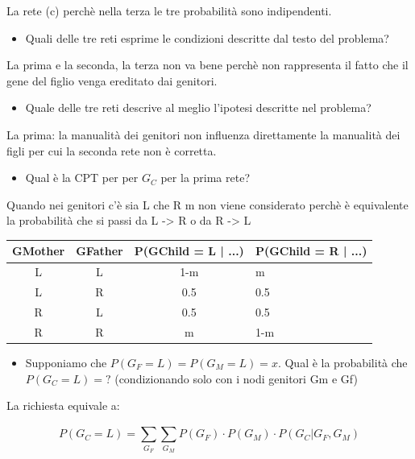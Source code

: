 \documentclass{article}
\begin{document}
La rete (c) perchè nella terza le tre probabilità sono indipendenti.

\begin{itemize}
	\item Quali delle tre reti esprime le condizioni descritte dal testo del problema?
\end{itemize}

La prima e la seconda, la terza non va bene perchè non rappresenta il fatto che il gene del figlio venga ereditato dai genitori.

\begin{itemize}
	\item Quale delle tre reti descrive al meglio l'ipotesi descritte nel problema?
\end{itemize}

	La prima: la manualità dei genitori non influenza direttamente la manualità dei figli per cui la seconda rete non è corretta.

\begin{itemize}
	\item Qual è la CPT per per \(G_C\) per la prima rete?
\end{itemize}
Quando nei genitori c'è sia L che R m non viene considerato perchè è equivalente la probabilità che si passi da L -> R o da R -> L \\

\begin{tabular}{|c|c|c|l|}
	\hline
	GMother & GFather & P(GChild = L | ...) & P(GChild  = R | ...) \\ \hline
	L       & L       & 1-m                 & m                    \\ \hline
	L       & R       & 0.5                 & 0.5                  \\ \hline
	R       & L       & 0.5                 & 0.5                  \\ \hline
	R       & R       & m                   & 1-m                  \\ \hline
\end{tabular}

\pagebreak

\begin{itemize}
	\item Supponiamo che \( P(G_F = L)  =  P(G_M = L) = x \).
	Qual è la probabilità che \( P(G_C = L)  = ? \) (condizionando solo con i nodi genitori Gm e Gf)
\end{itemize}

La richiesta equivale a:

\[
   P(G_C = L) = \sum_{G_F}^{} \sum_{G_M}^{} P(G_F) \cdot P(G_M) \cdot P(G_C | G_F, G_M)
\]
\end{document}
